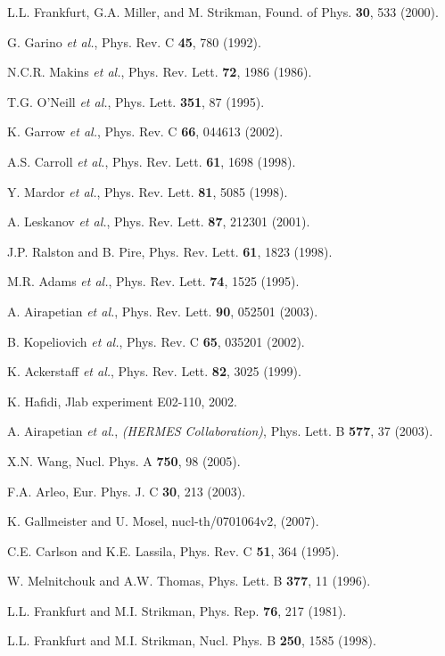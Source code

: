 \begin{thebibliography}{199}
L.L. Frankfurt, G.A. Miller, and M. Strikman, Found. of Phys. {\bf 30},
533 (2000).

G. Garino {\it et al.}, Phys. Rev. C {\bf 45}, 780 (1992).

N.C.R. Makins {\it et al.}, Phys. Rev. Lett. {\bf 72}, 1986 (1986).

T.G. O'Neill {\it et al.}, Phys. Lett. {\bf 351}, 87 (1995).

K. Garrow {\it et al.}, Phys. Rev. C {\bf 66}, 044613 (2002).

A.S. Carroll {\it et al.}, Phys. Rev. Lett. {\bf 61}, 1698 (1998).

Y. Mardor {\it et al.}, Phys. Rev. Lett. {\bf 81}, 5085 (1998).

A. Leskanov {\it et al.}, Phys. Rev. Lett. {\bf 87}, 212301 (2001).

J.P. Ralston and B. Pire, Phys. Rev. Lett. {\bf 61}, 1823 (1998).

M.R. Adams {\it et al.}, Phys. Rev. Lett. {\bf 74}, 1525 (1995).

A. Airapetian {\it et al.}, Phys. Rev. Lett. {\bf 90}, 052501 (2003).

B. Kopeliovich {\it et al.}, Phys. Rev. C {\bf 65}, 035201 (2002).

K. Ackerstaff {\it et al.}, Phys. Rev. Lett. {\bf 82}, 3025 (1999).

K. Hafidi, Jlab experiment E02-110, 2002.

A. Airapetian {\it et al.}, {\it (HERMES Collaboration)}, 
Phys. Lett. B {\bf 577}, 37 (2003).

X.N. Wang, Nucl. Phys. A {\bf 750}, 98 (2005).

F.A. Arleo, Eur. Phys. J. C {\bf 30}, 213 (2003).

K. Gallmeister and U. Mosel, nucl-th/0701064v2, (2007).

C.E. Carlson and K.E. Lassila, Phys. Rev. C {\bf 51}, 364 (1995).

W. Melnitchouk and A.W. Thomas, Phys. Lett. B {\bf 377}, 11 (1996).

L.L. Frankfurt and M.I. Strikman, Phys. Rep. {\bf 76}, 217 (1981).

L.L. Frankfurt and M.I. Strikman, Nucl. Phys. B {\bf 250}, 1585 (1998).


\end{thebibliography}
